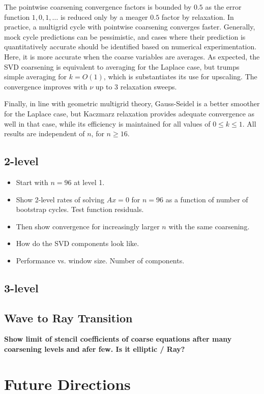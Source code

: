 \documentclass{article}
\begin{document}
The pointwise coarsening convergence factors is bounded by $0.5$ as the error function $1,0,1,\dots$ is reduced only by a meager $0.5$ factor by relaxation. In practice, a multigrid cycle with pointwise coarsening converges faster. Generally, mock cycle predictions can be pessimistic, and cases where their prediction is quantitatively accurate should be identified based on numerical experimentation. Here, it is more accurate when the coarse variables are averages. As expected, the SVD coarsening is equivalent to averaging for the Laplace case, but trumps simple averaging for $k = O(1)$, which is substantiates its use for upscaling. The convergence improves with $\nu$ up to $3$ relaxation sweeps.

Finally, in line with geometric multigrid theory, Gauss-Seidel is a better smoother for the Laplace case, but Kaczmarz relaxation provides adequate convergence as well in that case, while its efficiency is maintained for all values of $0 \leq k \leq 1$. All results are independent of $n$, for $n \geq 16$.

\subsection{2-level}
{\bf 
\begin{itemize}
\item Start with $n=96$ at level 1. 
\item Show 2-level rates of solving $A x = 0$ for $n=96$ as a function of number of bootstrap cycles. Test function residuals.
\item  Then show convergence for increasingly larger $n$ with the same coarsening.
\item How do the SVD components look like.
\item Performance vs. window size. Number of components.
\end{itemize}
}

\subsection{3-level}

\subsection{Wave to Ray Transition}
{\bf Show limit of stencil coefficients of coarse equations after many coarsening levels and afer few. Is it elliptic / Ray?}

\section{Future Directions}
\label{future}
\end{document}
